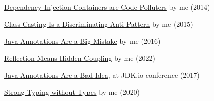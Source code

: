 \documentclass{article}
\begin{document}

\href{https://www.yegor256.com/2014/10/03/di-containers-are-evil.html}{Dependency Injection Containers are Code Polluters} by me (2014)

\href{https://www.yegor256.com/2015/04/02/class-casting-is-anti-pattern.html}{Class Casting Is a Discriminating Anti-Pattern} by me (2015)

\href{https://www.yegor256.com/2016/04/12/java-annotations-are-evil.html}{Java Annotations Are a Big Mistake} by me (2016)

\href{https://www.yegor256.com/2022/06/05/reflection-means-hidden-coupling.html}{Reflection Means Hidden Coupling} by me (2022)

\href{https://www.youtube.com/watch?v=cv23Z6xpwDw}{Java Annotations Are a Bad Idea}, at JDK.io conference (2017)

\href{https://www.yegor256.com/2020/11/10/typing-without-types.html}{Strong Typing without Types} by me (2020)
\end{document}
